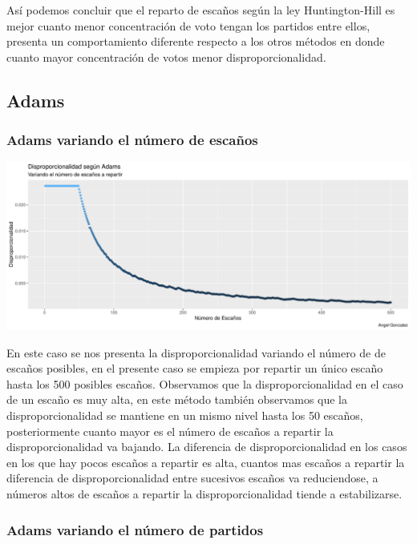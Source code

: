 \documentclass[12pt,a4paper,]{book}
\numberwithin{dummy}{section}
\theoremstyle{ocrenumbox}
\theoremstyle{blacknumex}
\theoremstyle{blacknumbox}
\theoremstyle{ocrenum}
\theoremstyle{ocrenum}
\begin{document}
Así podemos concluir que el reparto de escaños según la ley
Huntington-Hill es mejor cuanto menor concentración de voto tengan los
partidos entre ellos, presenta un comportamiento diferente respecto a
los otros métodos en donde cuanto mayor concentración de votos menor
disproporcionalidad.

\hypertarget{adams}{%
\subsection{Adams}\label{adams}}

\hypertarget{adams-variando-el-nuxfamero-de-escauxf1os}{%
\subsubsection{Adams variando el número de
escaños}\label{adams-variando-el-nuxfamero-de-escauxf1os}}

\begin{center}\includegraphics[width=0.95\linewidth]{figurasR/unnamed-chunk-34-1} \end{center}

En este caso se nos presenta la disproporcionalidad variando el número
de de escaños posibles, en el presente caso se empieza por repartir un
único escaño hasta los 500 posibles escaños. Observamos que la
disproporcionalidad en el caso de un escaño es muy alta, en este método
también observamos que la disproporcionalidad se mantiene en un mismo
nivel hasta los 50 escaños, posteriormente cuanto mayor es el número de
escaños a repartir la disproporcionalidad va bajando. La diferencia de
disproporcionalidad en los casos en los que hay pocos escaños a repartir
es alta, cuantos mas escaños a repartir la diferencia de
disproporcionalidad entre sucesivos escaños va reduciendose, a números
altos de escaños a repartir la disproporcionalidad tiende a
estabilizarse.

\hypertarget{adams-variando-el-nuxfamero-de-partidos}{%
\subsubsection{Adams variando el número de
partidos}\label{adams-variando-el-nuxfamero-de-partidos}}
\end{document}
